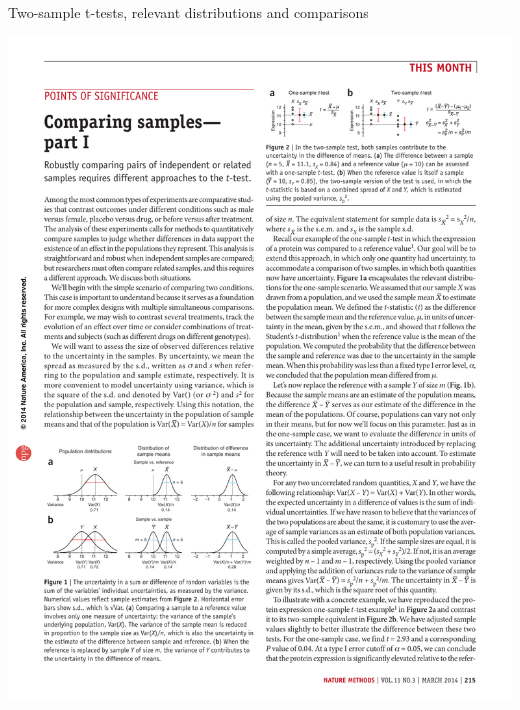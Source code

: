 \documentclass[presentation]{beamer}
\begin{document}
\begin{frame}[label={sec:org0b9d4d0}]{Two-sample t-tests, relevant distributions and comparisons}
\begin{center}
\includegraphics[height=0.33\textheight]{fig-twosample-distns.pdf}
\end{center}



\end{frame}
\end{document}
